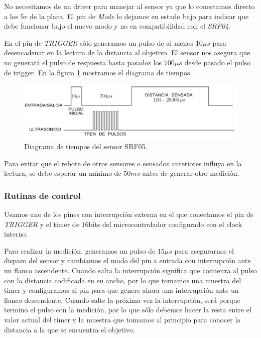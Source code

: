 No necesitamos de un driver para manejar al sensor ya que lo conectamos directo a los $5v$ de la placa.
El pin de \emph{Mode} lo dejamos en estado bajo para indicar que debe funcionar bajo el nuevo modo y no en compatibilidad con el \emph{SRF04}.

En el pin de \emph{TRIGGER} s\'olo generamos un pulso de al menos $10\mu s$ para desencadenar en la lectura de la distancia al objetivo.
El sensor nos asegura que no generar\'a el pulso de respuesta hasta pasados los $700\mu s$ desde pasado el pulso de trigger.
En la figura \ref{hF_srf05_pulse} mostramos el diagrama de tiempos.

\begin{figure}[ht]
	\centering
	\includegraphics[scale=0.25]{srf05_pulse.png}
	\caption{Diagrama de tiempos del sensor SRF05.}
	\label{hF_srf05_pulse}
\end{figure}

Para evitar que el rebote de otros sensores o sensados anteriores influya en la lectura, se debe esperar un m\'inimo de $50ms$ antes de
generar otro medici\'on.

\subsubsection{Rutinas de control}
\label{h_sensado_ultrasonido_rutinas}

Usamos uno de los pines con interrupci\'on externa en el que conectamos el pin de \emph{TRIGGER} y el timer de $16$bits del microcontrolador
configurado con el clock interno.

Para realizar la medici\'on, generamos un pulso de $15\mu s$ para asegurarnos el disparo del sensor y cambiamos el modo del pin a entrada con
interrupci\'on ante un flanco ascendente.
Cuando salta la interrupci\'on significa que comienza al pulso con la distancia codificada en su ancho, por lo que tomamos una muestra del
timer y configuramos al pin para que genere ahora una interrupci\'on ante un flanco descendente.
Cuando salte la pr\'oxima vez la interrupci\'on, ser\'a porque termino el pulso con la medici\'on, por lo que s\'olo debemos hacer la resta
entre el valor actual del timer y la muestra que tomamos al principio para conocer la distancia a la que se encuentra el objetivo.

